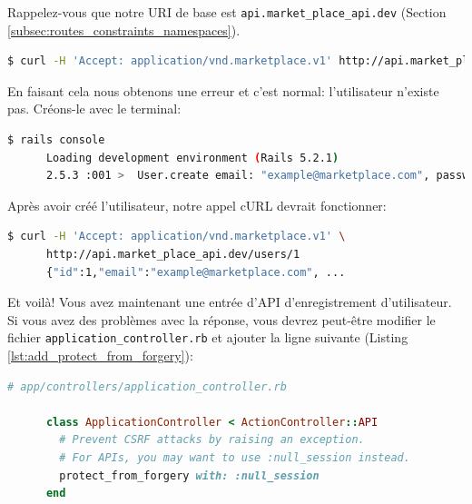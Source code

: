 \documentclass[]{report}
\begin{document}
      Rappelez-vous que notre URI de base est \verb|api.market_place_api.dev| (Section \ref{subsec:routes_constraints_namespaces}).

      \begin{scriptsize}
      \begin{lstlisting}[language=bash]
      $ curl -H 'Accept: application/vnd.marketplace.v1' http://api.market_place_api.dev/users/1
      \end{lstlisting}
      \end{scriptsize}

      En faisant cela nous obtenons une erreur et c'est normal: l'utilisateur n'existe pas. Créons-le avec le terminal:

      \begin{scriptsize}
      \begin{lstlisting}[language=bash]
      $ rails console
      Loading development environment (Rails 5.2.1)
      2.5.3 :001 >  User.create email: "example@marketplace.com", password: "12345678", password_confirmation: "12345678"
      \end{lstlisting}
      \end{scriptsize}

      Après avoir créé l'utilisateur, notre appel cURL devrait fonctionner:

      \begin{scriptsize}
      \begin{lstlisting}[language=bash]
      $ curl -H 'Accept: application/vnd.marketplace.v1' \
      http://api.market_place_api.dev/users/1
      {"id":1,"email":"example@marketplace.com", ...
      \end{lstlisting}
      \end{scriptsize}

      Et voilà! Vous avez maintenant une entrée d'API d'enregistrement d'utilisateur. Si vous avez des problèmes avec la réponse, vous devrez peut-être modifier le fichier \verb|application_controller.rb| et ajouter la ligne suivante (Listing \ref{lst:add_protect_from_forgery}):

      \begin{scriptsize}
      \begin{lstlisting}[language=ruby, caption={Correction de la réponde de l'API}, label={lst:add_protect_from_forgery}]
      # app/controllers/application_controller.rb

      class ApplicationController < ActionController::API
        # Prevent CSRF attacks by raising an exception.
        # For APIs, you may want to use :null_session instead.
        protect_from_forgery with: :null_session
      end
      \end{lstlisting}
      \end{scriptsize}
\end{document}
